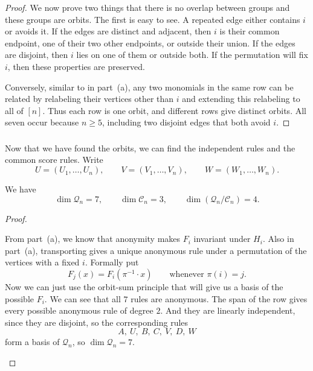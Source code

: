 \documentclass[11pt]{scrartcl}
\begin{document}
\begin{soln}
    \begin{proof}
		We now prove two things that there is no overlap between
		groups and these groups are orbits.
		The first is easy to see.
        A repeated edge either contains $i$ or avoids it.
        If the edges are distinct and adjacent, then $i$ is their
        common endpoint, one of their two other endpoints, or outside
        their union.
        If the edges are disjoint, then $i$ lies on one of them or
        outside both.
    	If the permutation will fix $i$, then these properties are 
		preserved.

        Conversely, similar to in part~(a), any two monomials in the same row can be related
        by relabeling their vertices other than $i$ and extending this
        relabeling to all of $[n]$.
        Thus each row is one orbit, and different rows give distinct
        orbits.
        All seven occur because $n\ge5$, including two disjoint edges
        that both avoid $i$.
    \end{proof}

    \subsubsection*{}

	Now that we have found the orbits, we can find the independent 
	rules and the common score rules. 
    Write
    \[
    U=(U_1,\ldots,U_n),\qquad
    V=(V_1,\ldots,V_n),\qquad
    W=(W_1,\ldots,W_n).
    \]

    \begin{claim*}
        We have
        \[
        \dim\mathcal Q_n=7,\qquad
        \dim\mathcal C_n=3,\qquad
        \dim(\mathcal Q_n/\mathcal C_n)=4.
        \]
    \end{claim*}
    \begin{proof}
        \begin{subproof}
            From part~(a), we know that
			anonymity makes $F_i$ invariant under $H_i$.
            Also in part~(a), transporting gives a unique 
			anonymous rule under a permutation of the vertices with a
			fixed $i$. Formally put 
            \[
            F_j(x)=F_i(\pi^{-1}\cdot x)
            \qquad\text{whenever }\pi(i)=j.
            \]
			Now we can just use the orbit-sum principle that 
			will give us a basis of the possible $F_i$. We can see that all $7$ rules are anonymous. 
            The span of 
			the row gives every possible anonymous rule of degree 
            $2$. 
             And they are linearly independent, since they are disjoint, so the corresponding rules
            \[
            A,\ U,\ B,\ C,\ V,\ D,\ W
            \]
            form a basis of $\mathcal Q_n$, so $\dim\mathcal Q_n=7$.
        \end{subproof}


\end{proof}
\end{soln}
\end{document}
